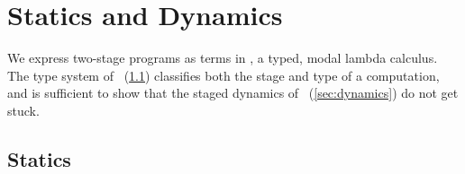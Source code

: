 
\section{\texorpdfstring{\lang}{λ12} Statics and Dynamics}
\label{sec:semantics}





We express two-stage programs as terms in \lang, a typed, modal lambda calculus. 
The type system of \lang\ (\ref{sec:statics}) classifies both the stage and type of a 
computation, and is sufficient to show that the staged dynamics of \lang\ (\ref{sec:dynamics})
do not get stuck.


\subsection{Statics}
\label{sec:statics}




